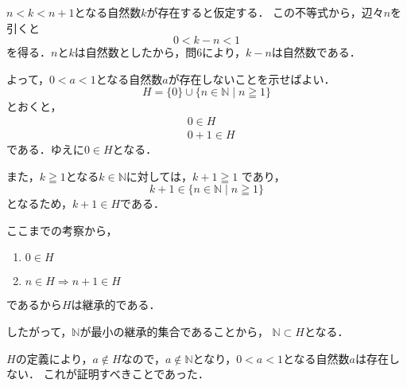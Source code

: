 
\begin{tproof}
    $n < k < n+1$となる自然数$k$が存在すると仮定する．
    この不等式から，辺々$n$を引くと
    \[
        0 < k - n < 1
    \]
    を得る．$n$と$k$は自然数としたから，問6により，$k-n$は自然数である．

    よって，$0<a<1$となる自然数$a$が存在しないことを示せばよい．
    \[
        H=\{0\} \cup \{n \in \mathbb{N} \mid n \geqq 1 \}
    \]
    とおくと，
    \begin{align*}
         & 0 \in H   \\
         & 0+1 \in H
    \end{align*}
    である．ゆえに$ 0 \in H$となる．

    また，$k \geqq 1$となる$k \in \mathbb{N}$に対しては，$k +1 \geqq 1$
    であり，
    \[
        k+1 \in \{n \in \mathbb{N} \mid n \geqq 1 \}
    \]
    となるため，$k+1 \in H$である．

    ここまでの考察から，
    \begin{enumerate}
        \item $0 \in H$
        \item $n \in H \Longrightarrow n+1 \in H$
    \end{enumerate}
    であるから$H$は継承的である．

    したがって，$\mathbb{N}$が最小の継承的集合であることから，
    $\mathbb{N} \subset H$となる．

    $H$の定義により，$a \notin H$なので，$a \notin \mathbb{N}$となり，$0<a<1$となる自然数$a$は存在しない．
    これが証明すべきことであった．
\end{tproof}






